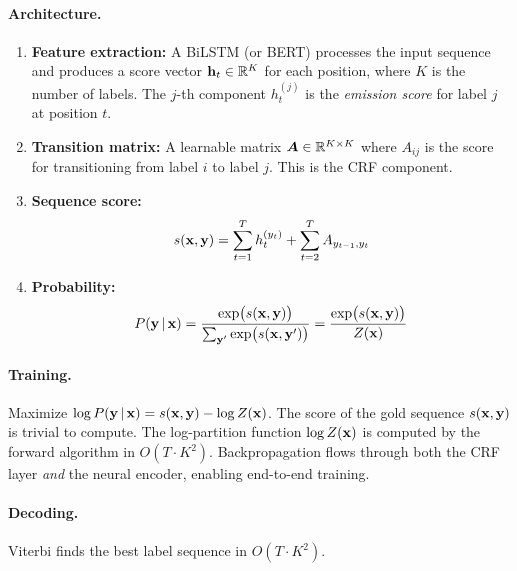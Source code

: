 \paragraph{Architecture.}
\begin{enumerate}
    \item \textbf{Feature extraction:} A BiLSTM (or BERT) processes the input
    sequence and produces a score vector $\mathbf{h}_t \in \mathbb{R}^K$ for each position,
    where $K$ is the number of labels.  The $j$-th component $h_t^{(j)}$
    is the \emph{emission score} for label $j$ at position $t$.

    \item \textbf{Transition matrix:} A learnable matrix $\bm{A} \in \mathbb{R}^{K \times K}$
    where $A_{ij}$ is the score for transitioning from label $i$ to label $j$.
    This is the CRF component.

    \item \textbf{Sequence score:}
    \begin{equation}
    s(\mathbf{x}, \mathbf{y}) = \sum_{t=1}^{T} h_t^{(y_t)} + \sum_{t=2}^{T} A_{y_{t-1}, y_t}
    \label{eq:neural_crf_score}
    \end{equation}

    \item \textbf{Probability:}
    \begin{equation}
    P(\mathbf{y} \,|\, \mathbf{x}) = \frac{\exp\bigl(s(\mathbf{x}, \mathbf{y})\bigr)}{\sum_{\mathbf{y}'} \exp\bigl(s(\mathbf{x}, \mathbf{y}')\bigr)}
    = \frac{\exp\bigl(s(\mathbf{x}, \mathbf{y})\bigr)}{Z(\mathbf{x})}
    \label{eq:neural_crf_prob}
    \end{equation}
\end{enumerate}

\paragraph{Training.}  Maximize $\log P(\mathbf{y} \,|\, \mathbf{x}) = s(\mathbf{x}, \mathbf{y}) - \log Z(\mathbf{x})$.
The score of the gold sequence $s(\mathbf{x}, \mathbf{y})$ is trivial to compute.  The
log-partition function $\log Z(\mathbf{x})$ is computed by the forward algorithm in
$O(T \cdot K^2)$.  Backpropagation flows through both the CRF layer \emph{and}
the neural encoder, enabling end-to-end training.

\paragraph{Decoding.}  Viterbi finds the best label sequence in $O(T \cdot K^2)$.

